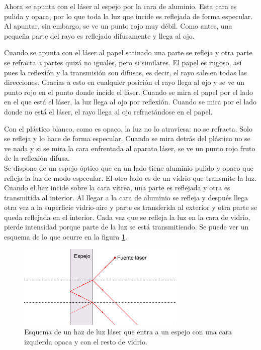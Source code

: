 \documentclass[12pt]{article}
\numberwithin{table}{section}
\numberwithin{figure}{section}
\numberwithin{equation}{section}
\begin{document}
Ahora se apunta con el láser al espejo por la cara de aluminio. Esta cara es pulida y opaca, por lo que toda la luz que incide es reflejada de forma especular. Al apuntar, sin embargo, se ve un punto rojo muy débil. Como antes, una pequeña parte del rayo es reflejado difusamente y llega al ojo.

Cuando se apunta con el láser al papel satinado una parte se refleja y otra parte se refracta a partes quizá no iguales, pero sí similares. El papel es rugoso, así pues la reflexión y la transmisión son difusas, es decir, el rayo sale en todas las direcciones. Gracias a esto en cualquier posición el rayo llega al ojo y se ve un punto rojo en el punto donde incide el láser. Cuando se mira el papel por el lado en el que está el láser, la luz llega al ojo por reflexión. Cuando se mira por el lado donde no está el láser, el rayo llega al ojo refractándose en el papel.

Con el plástico blanco, como es opaco, la luz no lo atraviesa: no se refracta. Solo se refleja y lo hace de forma especular. Cuando se mira detrás del plástico no se ve nada y si se mira la cara enfrentada al aparato láser, se ve un punto rojo fruto de la reflexión difusa.
\\

Se dispone de un espejo óptico que en un lado tiene aluminio pulido y opaco que refleja la luz de modo especular. El otro lado es de un vidrio que transmite la luz. Cuando el haz incide sobre la cara vítrea, una parte es reflejada y otra es transmitida al interior. Al llegar a la cara de aluminio se refleja y después llega otra vez a la superficie vidrio-aire y parte es transferida al exterior y otra parte se queda reflejada en el interior. Cada vez que se refleja la luz en la cara de vidrio, pierde intensidad porque parte de la luz se está transmitiendo. Se puede ver un esquema de lo que ocurre en la figura \ref{P2espejo}.

\begin{figure}[!ht]
\begin{center}
\includegraphics[width=8cm]{P2Espejo.png}
\caption{Esquema de un haz de luz láser que entra a un espejo con una cara izquierda opaca y con el resto de vidrio.}
\label{P2espejo}
\end{center}
\end{figure}
\end{document}
